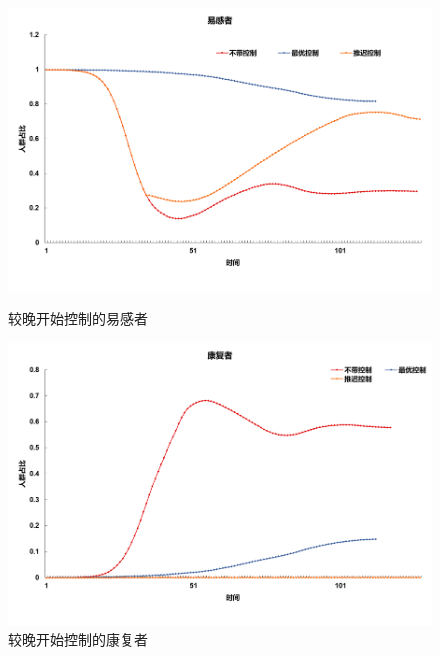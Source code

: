 \begin{figure}[htbp]
	\begin{minipage}{0.49\linewidth}
		\centering
		\includegraphics[width=0.9\linewidth]{fig/image038.png}
		\caption{较晚开始控制的易感者}
		\label{fig:ima19}%
	\end{minipage}
	\begin{minipage}{0.49\linewidth}
		\centering
		\includegraphics[width=0.9\linewidth]{fig/image042.png}
		\caption{较晚开始控制的康复者}
		\label{fig:ima20}%
	\end{minipage}


\end{figure}
